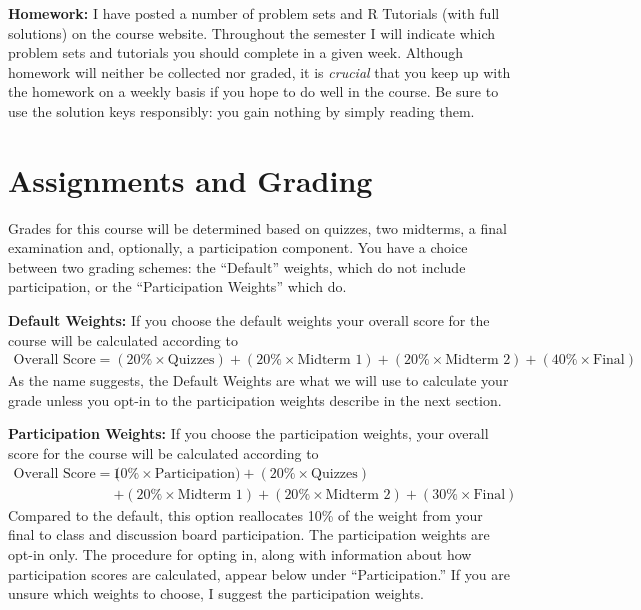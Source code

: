 \documentclass[11pt, letterpaper]{article}
\begin{document}
\medskip

\noindent \textbf{Homework:} 
I have posted a number of problem sets and R Tutorials (with full solutions) on the course website.
Throughout the semester I will indicate which problem sets and tutorials you should complete in a given week.
Although homework will neither be collected nor graded, it is \emph{crucial} that you keep up with the homework on a weekly basis if you hope to do well in the course.
Be sure to use the solution keys responsibly: you gain nothing by simply reading them.



\section*{Assignments and Grading}

Grades for this course will be determined based on quizzes, two midterms, a final examination and, optionally, a participation component.
You have a choice between two grading schemes: the ``Default'' weights, which do not include participation, or the ``Participation Weights'' which do. 

\bigskip 

\noindent \textbf{Default Weights:} If you choose the default weights your overall score for the course will be calculated according to
	\begin{equation*}
	\begin{split}
		\mbox{Overall Score} = (20\% \times \mbox{Quizzes})  + (20\% \times \mbox{Midterm 1}) + (20\% \times \mbox{Midterm 2}) + (40\% \times \mbox{Final})
	\end{split}
	\end{equation*}
As the name suggests, the Default Weights are what we will use to calculate your grade unless you opt-in to the participation weights describe in the next section.

\bigskip

\noindent \textbf{Participation Weights:} If you choose the participation weights, your overall score for the course will be calculated according to
	\begin{equation*}
	\begin{split}
		\mbox{Overall Score} = (&10\% \times \mbox{Participation}) + (20\% \times \mbox{Quizzes})  \\ &
							 + (20\% \times \mbox{Midterm 1}) + (20\% \times \mbox{Midterm 2}) + (30\% \times \mbox{Final})
	\end{split}
	\end{equation*}
Compared to the default, this option reallocates 10\% of the weight from your final to class and discussion board participation.
The participation weights are opt-in only.
The procedure for opting in, along with information about how participation scores are calculated, appear below under ``Participation.''
If you are unsure which weights to choose, I suggest the participation weights. 
\end{document}
